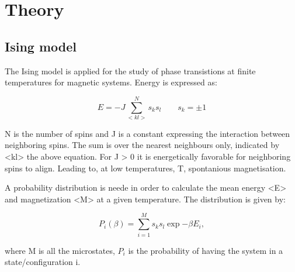 \documentclass[../main.tex]{subfiles}
\begin{document}
\section{Theory}
\subsection{Ising model}
The Ising model is applied for the study of phase transistions at finite temperatures
for magnetic systems. Energy is expressed as:

\begin{equation}
  E = -J \sum  _{<kl>}^N s_ks_l \qquad s_k = \pm 1
\end{equation}

N is the number of spins and J is a constant expressing the interaction between neighboring spins. The sum is over the nearest neighbours only, indicated by <kl> the above equation. For J > 0 it is energetically favorable for neighboring spins to align. Leading to, at low temperatures, T, spontanious magnetisation.

A probability distribution is neede in order to calculate the mean energy <E> and magnetization <M> at a given temperature. The distribution is given by:

\begin{equation}
  P_i(\beta)=  \sum  _{i = 1}^M s_ks_l \exp{-\beta E_i},
\end{equation}

where M is all the microstates, $P_i$ is the probability of having the system in a state/configuration i.
\end{document}
